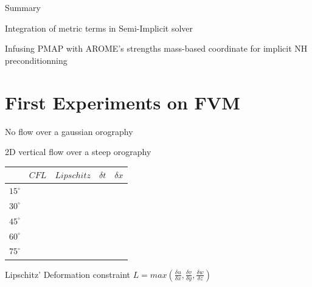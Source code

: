\documentclass{beamer}
\begin{document}
\begin{frame}{Summary}

    \begin{block}{Integration of metric terms in Semi-Implicit solver}

    \end{block} 

    \begin{block}{Infusing PMAP with AROME's strengths}
        mass-based coordinate for implicit NH preconditionning 
    \end{block}
    
\end{frame}




\section{First Experiments on FVM}

\begin{frame}{No flow over a gaussian orography}

\end{frame}

\begin{frame}{2D vertical flow over a steep orography}

    \begin{center}
        \begin{tabular}{|c|c|c|c|c|}
            \hline
              & $CFL$ & $Lipschitz$ & $\delta t$ & $\delta x$\\
            \hline
            $15^{\circ}$ &  &  &  & \\
            \hline
            $30^{\circ}$ &  &  &  & \\
            \hline
            $45^{\circ}$ &  &  &  & \\
            \hline
            $60^{\circ}$ &  &  &  & \\
            \hline 
            $75^{\circ}$ &  &  &  & \\
            \hline 
        \end{tabular}       
    \end{center}

    \begin{block}{Lipschitz' Deformation constraint} 
        $L = max(\frac{\delta u}{\delta x}, \frac{\delta v}{\delta y}, \frac{\delta w}{\delta z})$
    \end{block}

\end{frame}
\end{document}
